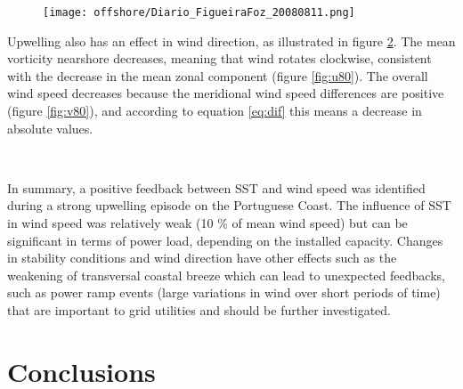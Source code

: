 \begin{figure}[!htp]
    \centering
    \texttt{[image: offshore/Diario\_FigueiraFoz\_20080811.png]}
    \label{fig:stabFig}
\end{figure}
\FloatBarrier

Upwelling also has an effect in wind direction, as illustrated in figure \ref{fig:vort_uv_80}. The mean vorticity nearshore decreases, meaning that wind rotates clockwise, consistent with the decrease in the mean zonal component (figure \ref{fig:u80}). The overall wind speed decreases because the meridional wind speed differences are positive (figure \ref{fig:v80}), and according to equation \eqref{eq:dif} this means a decrease in absolute values. 

\begin{figure}[!htp]
    \centering
    \\
    \label{fig:vort_uv_80}
\end{figure}
\FloatBarrier

In summary, a positive feedback between SST and wind speed was identified during a strong upwelling episode on the Portuguese Coast. The influence of SST in wind speed was relatively weak (10 \% of mean wind speed) but can be significant in terms of power load, depending on the installed capacity. Changes in stability conditions and wind direction have other effects such as the weakening of transversal coastal breeze which can lead to unexpected feedbacks, such as power ramp events (large variations in wind over short periods of time) that are important to grid utilities and should be further investigated.


\section{Conclusions}

